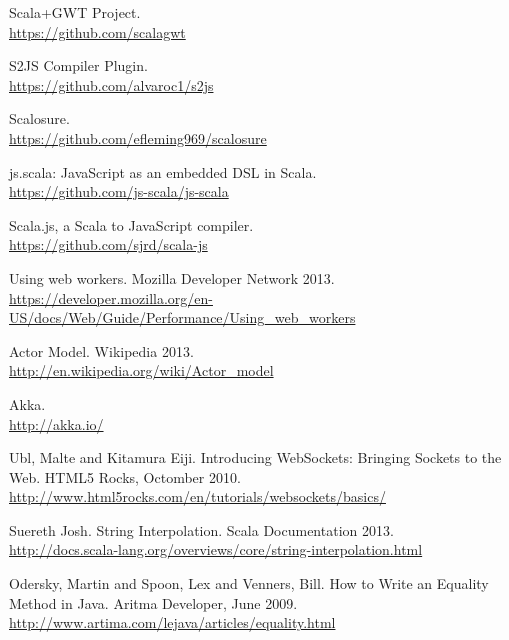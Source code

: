 \begin{thebibliography}{99}
  Scala+GWT Project.\\
  \url{https://github.com/scalagwt}
	
  S2JS Compiler Plugin.\\
  \url{https://github.com/alvaroc1/s2js}
	
  Scalosure.\\
  \url{https://github.com/efleming969/scalosure}
	
  js.scala: JavaScript as an embedded DSL in Scala.\\
  \url{https://github.com/js-scala/js-scala}
	
  Scala.js, a Scala to JavaScript compiler.\\
  \url{https://github.com/sjrd/scala-js}
	
  Using web workers. Mozilla Developer Network 2013.\\
  \url{https://developer.mozilla.org/en-US/docs/Web/Guide/Performance/Using\_web\_workers}
	
  Actor Model. Wikipedia 2013.\\
  \url{http://en.wikipedia.org/wiki/Actor\_model}
	
	Akka.\\
	\url{http://akka.io/}
	
  {\sc Ubl}, Malte and {\sc Kitamura} Eiji. Introducing WebSockets: Bringing Sockets to the Web. HTML5 Rocks, Octomber 2010.\\
	\url{http://www.html5rocks.com/en/tutorials/websockets/basics/}
	
	{\sc Suereth} Josh. String Interpolation. Scala Documentation 2013.\\
	\url{http://docs.scala-lang.org/overviews/core/string-interpolation.html}
	
  {\sc Odersky,} Martin and {\sc Spoon,} Lex and {\sc Venners,} Bill. How to Write an Equality Method in Java. Aritma Developer, June 2009.\\
	\url{http://www.artima.com/lejava/articles/equality.html}
	
\end{thebibliography}